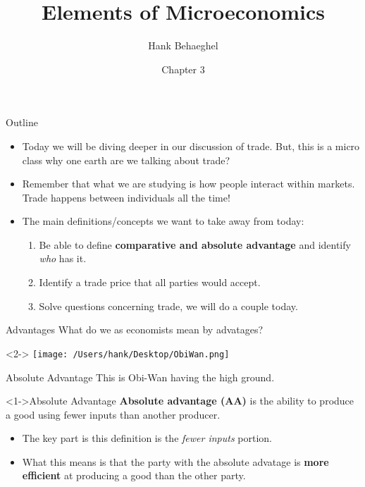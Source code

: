 \documentclass[aspectratio=169]{beamer}
\title{Elements of Microeconomics}
\author{Hank Behaeghel}
\institute{Johns Hopkins University}
\date{Chapter 3}
\begin{document}
\maketitle

\begin{frame}{Outline}
    \begin{itemize}
        \item Today we will be diving deeper in our discussion of trade.
        But, this is a micro class why one earth are we talking about trade?
        \item Remember that what we are studying is how people interact within markets. Trade happens between individuals all the time!
        \item The main definitions/concepts we want to take away from today:
        \begin{enumerate}
            \item Be able to define \textbf{comparative and absolute advantage} and identify \textit{who} has it.
            \item Identify a trade price that all parties would accept.
            \item Solve questions concerning trade, we will do a couple today.
        \end{enumerate}
    \end{itemize}
\end{frame}

\begin{frame}{Advantages}
What do we as economists mean by advatages?
    \begin{center}<2->
    \texttt{[image: /Users/hank/Desktop/ObiWan.png]}
    \end{center}
\end{frame}


\begin{frame}{Absolute Advantage}
    This is Obi-Wan having the high ground.
   \begin{block} <1->{Absolute Advantage}
        \textbf{Absolute advantage (AA)} is the ability to produce a good using fewer inputs than another producer.
    \end{block}
    
    \begin{itemize}
        \item<2-> The key part is this definition is the \textit{fewer inputs} portion.
        \item<3-> What this means is that the party with the absolute advatage is \textbf{more efficient} at producing a good than the other party.
    \end{itemize}
\end{frame}
\end{document}
